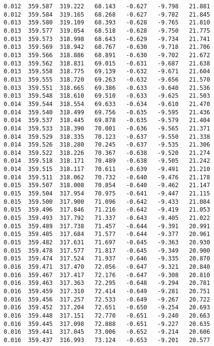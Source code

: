 \begin{verbatim}
   0.012  359.587  319.222   68.143   -0.627   -9.798   21.881
   0.012  359.584  319.165   68.268   -0.627   -9.782   21.845
   0.013  359.580  319.109   68.393   -0.628   -9.765   21.810
   0.013  359.577  319.054   68.518   -0.628   -9.750   21.775
   0.013  359.573  318.998   68.643   -0.629   -9.734   21.741
   0.013  359.569  318.942   68.767   -0.630   -9.718   21.706
   0.013  359.566  318.886   68.891   -0.630   -9.702   21.672
   0.013  359.562  318.831   69.015   -0.631   -9.687   21.638
   0.013  359.558  318.775   69.139   -0.632   -9.671   21.604
   0.013  359.555  318.720   69.263   -0.632   -9.656   21.570
   0.013  359.551  318.665   69.386   -0.633   -9.640   21.536
   0.013  359.548  318.610   69.510   -0.633   -9.625   21.503
   0.014  359.544  318.554   69.633   -0.634   -9.610   21.470
   0.014  359.540  318.499   69.756   -0.635   -9.595   21.436
   0.014  359.537  318.445   69.878   -0.635   -9.579   21.404
   0.014  359.533  318.390   70.001   -0.636   -9.565   21.371
   0.014  359.529  318.335   70.123   -0.637   -9.550   21.338
   0.014  359.526  318.280   70.245   -0.637   -9.535   21.306
   0.014  359.522  318.226   70.367   -0.638   -9.520   21.274
   0.014  359.518  318.171   70.489   -0.638   -9.505   21.242
   0.014  359.515  318.117   70.611   -0.639   -9.491   21.210
   0.014  359.511  318.062   70.732   -0.640   -9.476   21.178
   0.015  359.507  318.008   70.854   -0.640   -9.462   21.147
   0.015  359.504  317.954   70.975   -0.641   -9.447   21.115
   0.015  359.500  317.900   71.096   -0.642   -9.433   21.084
   0.015  359.496  317.846   71.216   -0.642   -9.419   21.053
   0.015  359.493  317.792   71.337   -0.643   -9.405   21.022
   0.015  359.489  317.738   71.457   -0.644   -9.391   20.991
   0.015  359.485  317.684   71.577   -0.644   -9.377   20.961
   0.015  359.482  317.631   71.697   -0.645   -9.363   20.930
   0.015  359.478  317.577   71.817   -0.645   -9.349   20.900
   0.015  359.474  317.524   71.937   -0.646   -9.335   20.870
   0.016  359.471  317.470   72.056   -0.647   -9.321   20.840
   0.016  359.467  317.417   72.176   -0.647   -9.308   20.810
   0.016  359.463  317.363   72.295   -0.648   -9.294   20.781
   0.016  359.459  317.310   72.414   -0.649   -9.281   20.751
   0.016  359.456  317.257   72.533   -0.649   -9.267   20.722
   0.016  359.452  317.204   72.651   -0.650   -9.254   20.693
   0.016  359.448  317.151   72.770   -0.651   -9.240   20.663
   0.016  359.445  317.098   72.888   -0.651   -9.227   20.635
   0.016  359.441  317.045   73.006   -0.652   -9.214   20.606
   0.016  359.437  316.993   73.124   -0.653   -9.201   20.577

\end{verbatim}
